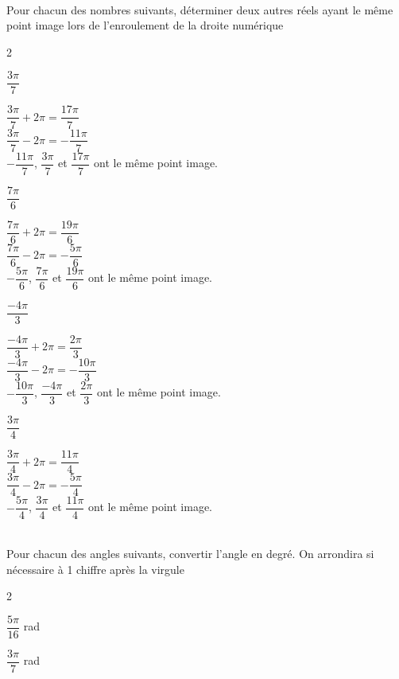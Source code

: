 \documentclass[a4paper,12pt]{article}        %
\begin{document}
\\
Pour chacun des nombres suivants, déterminer deux autres réels ayant le même point image lors de l'enroulement de la droite numérique
\begin{multicols}{2}
\begin{enumMet}
    \item $\dfrac{3\pi}{7}$\\
    \begin{corrBox}
        $\dfrac{3\pi}{7}+2\pi=\dfrac{17\pi}{7}$\\
        $\dfrac{3\pi}{7}-2\pi=-\dfrac{11\pi}{7}$\\
        $-\dfrac{11\pi}{7}$, $\dfrac{3\pi}{7}$ et $\dfrac{17\pi}{7}$ ont le même point image.
    \end{corrBox}
    \item $\dfrac{7\pi}{6}$\\
    \begin{corrBox}
        $\dfrac{7\pi}{6}+2\pi=\dfrac{19\pi}{6}$\\
        $\dfrac{7\pi}{6}-2\pi=-\dfrac{5\pi}{6}$\\
        $-\dfrac{5\pi}{6}$, $\dfrac{7\pi}{6}$ et $\dfrac{19\pi}{6}$ ont le même point image.
    \end{corrBox}
    \item $\dfrac{-4\pi}{3}$\\
    \begin{corrBox}
        $\dfrac{-4\pi}{3}+2\pi=\dfrac{2\pi}{3}$\\
        $\dfrac{-4\pi}{3}-2\pi=-\dfrac{10\pi}{3}$\\
        $-\dfrac{10\pi}{3}$, $\dfrac{-4\pi}{3}$ et $\dfrac{2\pi}{3}$ ont le même point image.
    \end{corrBox}
    \item $\dfrac{3\pi}{4}$\\
    \begin{corrBox}
        $\dfrac{3\pi}{4}+2\pi=\dfrac{11\pi}{4}$\\
        $\dfrac{3\pi}{4}-2\pi=-\dfrac{5\pi}{4}$\\
        $-\dfrac{5\pi}{4}$, $\dfrac{3\pi}{4}$ et $\dfrac{11\pi}{4}$ ont le même point image.
    \end{corrBox}
\end{enumMet}
\end{multicols}

\\
Pour chacun des angles suivants, convertir l'angle en degré. On arrondira si nécessaire à 1 chiffre après la virgule
\begin{multicols}{2}
\begin{enumMet}
    \item $\dfrac{5\pi}{16}$ rad \quad {}
    \item $\dfrac{3\pi}{7}$ rad \quad {}
\end{enumMet}
\end{multicols}
\end{document}
